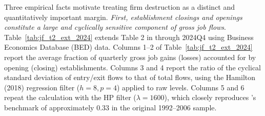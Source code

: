 \documentclass[authoryear, review, 12pt]{elsarticle}
\begin{document}
	Three empirical facts motivate treating firm destruction as a 
	distinct and quantitatively important margin. \textit{First, establishment closings and openings constitute a large and cyclically sensitive component of gross job flows}. Table~\ref{tab:jf_t2_ext_2024} extends Table 2 in \citet{jaimovich_2008} through 2024Q4 using Business Economics Database (BED) data. Columns 1--2 of Table~\ref{tab:jf_t2_ext_2024} report the average fraction of quarterly gross job gains (losses) accounted for by opening (closing) establishments. Columns 3 and 4 report the ratio of the cyclical standard deviation of entry/exit flows to that of total flows, using the Hamilton (2018) regression filter ($h=8, p=4$) applied to raw levels. Columns 5 and 6 repeat the calculation with the HP filter ($\lambda=1600$), which closely reproduces \citet{jaimovich_2008}'s benchmark of approximately 0.33 in the original 1992--2006 sample.
	
\end{document}
